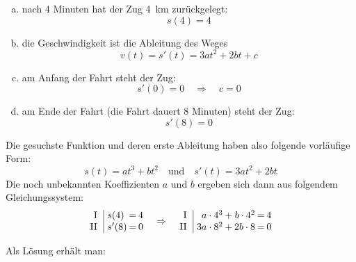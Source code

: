 \begin{exercise}
\begin{enumerate}[a)]
      \item nach 4 Minuten hat der Zug
            \SI{4}{\kilo\metre} zurückgelegt:
            \begin{equation*}
              s(4)=4
            \end{equation*}
      \item die Geschwindigkeit ist die Ableitung des Weges
            \begin{equation*}
              v(t)=s'(t)=3at^2+2bt+c
            \end{equation*}
      \item am Anfang der Fahrt steht der Zug:
            \begin{equation*}
              s'(0)=0
              \quad\Rightarrow\quad
              c=0
            \end{equation*}
      \item am Ende der Fahrt (die Fahrt dauert
            8 Minuten) steht der Zug:
            \begin{equation*}
              s'(8)=0
            \end{equation*}
    \end{enumerate}
    Die gesuchste Funktion und deren erste Ableitung
    haben also folgende vorläufige Form:
    \begin{equation*}
      s(t)=at^3+bt^2
      \quad\text{und}\quad
      s'(t)=3at^2+2bt
    \end{equation*}
    Die noch unbekannten Koeffizienten $a$ und
    $b$ ergeben sich dann aus folgendem
    Gleichungssystem:
    \begin{equation*}
      \setlength{\arraycolsep}{0.1em}%
      \begin{array}{r|lcr}
         \text{I}\;\; & \;  s(4) & = & 4 \\
        \text{II}\;\; & \; s'(8) & = & 0
      \end{array}
      \quad\Rightarrow\quad
      \begin{array}{r|rcrcr}
         \text{I}\;\; & \;  a\cdot4^3 & + &  b\cdot4^2 & = & 4 \\
        \text{II}\;\; & \; 3a\cdot8^2 & + & 2b\cdot8   & = & 0
      \end{array}
    \end{equation*}
    \par Als Lösung erhält man:\\
    \begin{minipage}[t]{0.49\linewidth}
      \vspace*{-\abovedisplayskip}

\end{minipage}
\end{exercise}
